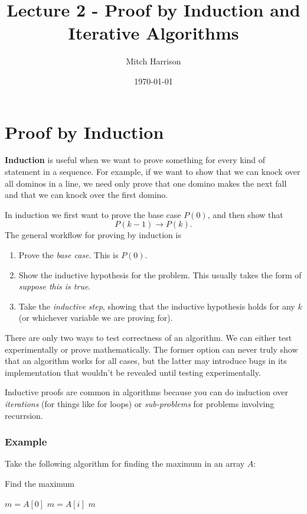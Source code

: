 \documentclass[titlepage, 12pt, leqno]{article}
\title{\Huge{Lecture 2 - Proof by Induction and Iterative Algorithms}}
\author{\large{Mitch Harrison}}
\date{\today}
\begin{document}
\setlength{\parskip}{1\baselineskip}
\setlength{\parindent}{15pt}
\maketitle
\tableofcontents
\newpage


\section{Proof by Induction}

\begin{definition}
    \textbf{Induction} is useful when we want to prove something for every
    kind of statement in a sequence. For example, if we want to show that we
    can knock over all dominos in a line, we need only prove that one domino
    makes the next fall and that we can knock over the first domino.
\end{definition}

In induction we first want to prove the base case $P(0)$, and then show that
\[
P(k-1) \rightarrow P(k).
\]
The general workflow for proving by induction is
\begin{enumerate}
    \item Prove the \textit{base case}. This is $P(0)$.
    \item Show the inductive hypothesis for the problem. This usually takes the
        form of \textit{suppose this is true}.
    \item Take the \textit{inductive step}, showing that the inductive
        hypothesis holds for any $k$ (or whichever variable we are proving for).
\end{enumerate}

There are only two ways to test correctness of an algorithm. We can either test
experimentally or prove mathematically. The former option can never truly show
that an algorithm works for all cases, but the latter may introduce bugs in its
implementation that wouldn't be revealed until testing experimentally.

Inductive proofs are common in algorithms because you can do induction over
\textit{iterations} (for things like for loops) or \textit{sub-problems} for
problems involving recurrsion.

\pagebreak

\subsubsection{Example}
Take the following algorithm for finding the maximum in an array $A$:
\begin{algorithm}
\caption{Find the maximum}
\begin{algorithmic}
\State $m = A[0]$
\State $m = A[i]$
    \EndIf
\EndFor
\State \Return $m$
\EndProcedure 
\end{algorithmic}
\end{algorithm}
\end{document}
